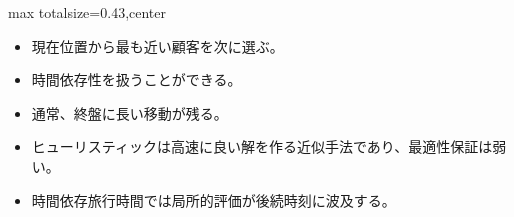 \clearpage
{}
\begin{minipage}[t]{0.405\textwidth}
\begin{adjustbox}{max totalsize={\textwidth}{0.43\textheight},center}
\begin{minipage}{\textwidth}\scriptsize
{}\begin{itemize}
\item 現在位置から最も近い顧客を次に選ぶ。
\item 時間依存性を扱うことができる。
\item 通常、終盤に長い移動が残る。
\end{itemize}\begin{itemize}
\item ヒューリスティックは高速に良い解を作る近似手法であり、最適性保証は弱い。
\item 時間依存旅行時間では局所的評価が後続時刻に波及する。
\end{itemize}
\end{minipage}
\end{adjustbox}
\end{minipage}\hfill
